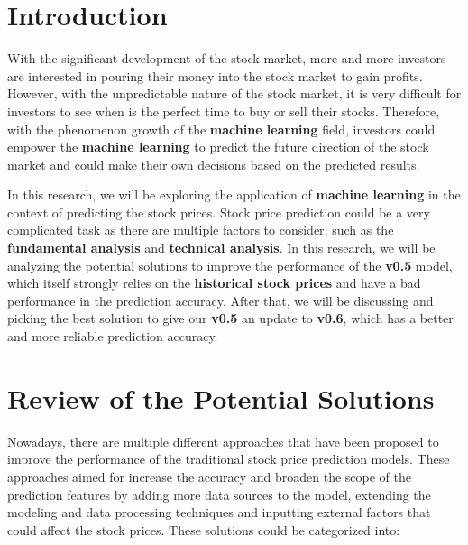 \documentclass[11pt]{article}
\begin{document}
\section{Introduction}
With the significant development of the stock market, more and more investors are interested in
pouring their money into the stock market to gain profits. However, with the unpredictable nature
of the stock market, it is very difficult for investors to see when is the perfect time to buy or
sell their stocks. Therefore, with the phenomenon growth of the \textbf{machine learning} field,
investors could empower the \textbf{machine learning} to predict the future direction of the stock
market and could make their own decisions based on the predicted results.

In this research, we will be exploring the application of \textbf{machine learning} in the context of
predicting the stock prices. Stock price prediction could be a very complicated task as there are multiple
factors to consider, such as the \textbf{fundamental analysis} and \textbf{technical analysis}. In this research,
we will be analyzing the potential solutions to improve the performance of the \textbf{v0.5} model, which itself
strongly relies on the \textbf{historical stock prices} and have a bad performance in the prediction accuracy.
After that, we will be discussing and picking the best solution to give our \textbf{v0.5} an update to \textbf{v0.6},
which has a better and more reliable prediction accuracy.

\section{Review of the Potential Solutions}
Nowadays, there are multiple different approaches that have been proposed to improve the performance of the traditional
stock price prediction models. These approaches aimed for increase the accuracy and broaden the scope of the prediction
features by adding more data sources to the model, extending the modeling and data processing techniques and inputting
external factors that could affect the stock prices. These solutions could be categorized into:
\end{document}

